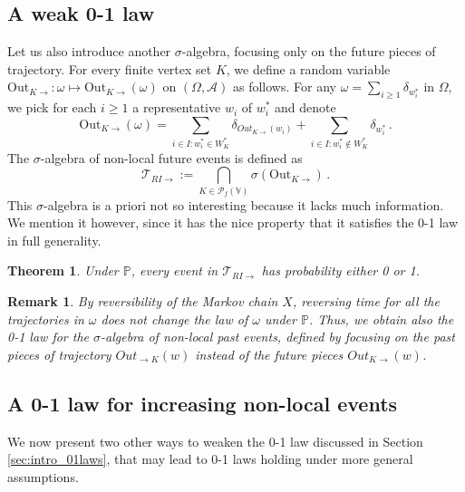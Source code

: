 \documentclass[12pt,a4paper]{article}
\newtheorem{theorem}[theo]{Theorem}
\newtheorem{remark}[theo]{Remark}
\newcommand{\1}[1]{{\mathbf 1}{\{#1\}}}
\newcommand{\bbP}{\mathbb{P}}
\newcommand{\8}{{\infty}}
\newcommand{\Out}{\mathrm{Out}}
\begin{document}
\subsection{A weak 0-1 law}

Let us also introduce another $\sigma$-algebra, focusing only on the future pieces of trajectory. For every finite vertex set $K$, we define a random variable $\Out_{K\rightarrow} : \omega \mapsto \Out_{K\rightarrow}(\omega)$ on $(\Omega, \mathcal{A})$ as follows. For any $\omega=\sum_{i\ge 1} \delta_{w_i^*}$ in $\Omega$, we pick for each $i\ge 1$ a representative $w_i$ of $w_i^*$ and denote
\begin{equation}
\Out_{K\rightarrow}(\omega)=\sum_{i\in I : w_i^*\in W_K^*} \delta_{Out_{K\rightarrow}(w_i)} + \sum_{i\in I :  w_i^*\notin W_K^*} \delta_{w_i^*} \, .
\end{equation}
The $\sigma$-algebra of non-local future events is defined as
\begin{equation}
  \mathcal{T}_{RI\rightarrow} := \bigcap_{K\in \mathcal{P}_f(\mathbb{V})} \sigma(\Out_{K\rightarrow}) \, .
\end{equation}
This $\sigma$-algebra is a priori not so interesting because it lacks much information. We mention it however, since it has the nice property that it satisfies the 0-1 law in full generality. 
\begin{theorem}\label{th:weak_01law}
Under $\bbP$, every event in $\mathcal{T}_{RI\rightarrow}$ has probability either 0 or 1.
\end{theorem}

\begin{remark}\label{rem:backward_weak}
  By reversibility of the Markov chain $X$, reversing time for all the trajectories in $\omega$ does not change the law of $\omega$ under $\bbP$.
  Thus, we obtain also the 0-1 law for the $\sigma$-algebra of non-local past events, defined by focusing on the past pieces of trajectory $Out_{\rightarrow K}(w)$ instead of the future pieces $Out_{K\rightarrow}(w)$.
\end{remark}



\subsection{A 0-1 law for increasing non-local events}

We now present two other ways to weaken the 0-1 law discussed in Section \ref{sec:intro_01laws}, that may lead to 0-1 laws holding under more general assumptions.
\end{document}
